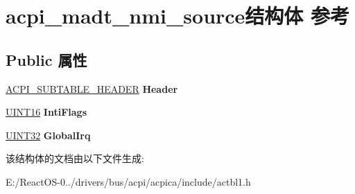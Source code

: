 \hypertarget{structacpi__madt__nmi__source}{}\section{acpi\+\_\+madt\+\_\+nmi\+\_\+source结构体 参考}
\label{structacpi__madt__nmi__source}
\subsection*{Public 属性}
\begin{DoxyCompactItemize}
\item 
\mbox{\label{structacpi__madt__nmi__source_a5772fc15d8be4a108507e50be42102d2}} 
\hyperlink{structacpi__subtable__header}{A\+C\+P\+I\+\_\+\+S\+U\+B\+T\+A\+B\+L\+E\+\_\+\+H\+E\+A\+D\+ER} {\bfseries Header}
\item 
\mbox{\label{structacpi__madt__nmi__source_a9ad5230c45da0c8bdfa355cb15773850}} 
\hyperlink{_processor_bind_8h_a09f1a1fb2293e33483cc8d44aefb1eb1}{U\+I\+N\+T16} {\bfseries Inti\+Flags}
\item 
\mbox{\label{structacpi__madt__nmi__source_a18f9b6e893a02a71b65e2b5e7e92946a}} 
\hyperlink{_processor_bind_8h_ae1e6edbbc26d6fbc71a90190d0266018}{U\+I\+N\+T32} {\bfseries Global\+Irq}
\end{DoxyCompactItemize}


该结构体的文档由以下文件生成\+:\begin{DoxyCompactItemize}
\item 
E\+:/\+React\+O\+S-\/0../drivers/bus/acpi/acpica/include/actbl1.\+h\end{DoxyCompactItemize}
